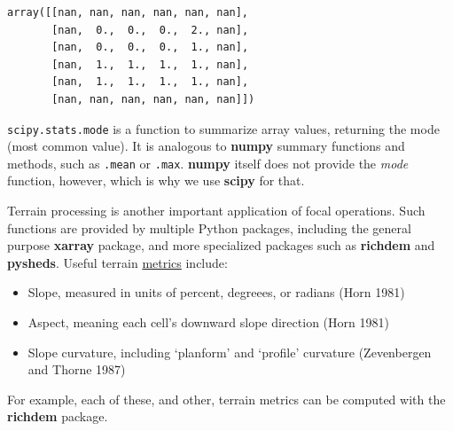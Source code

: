 \documentclass[
  letterpaper,
]{krantz}
\providecommand{\tightlist}{%
  \setlength{\itemsep}{0pt}\setlength{\parskip}{0pt}}\usepackage{longtable,booktabs,array}
\begin{document}
\begin{verbatim}
array([[nan, nan, nan, nan, nan, nan],
       [nan,  0.,  0.,  0.,  2., nan],
       [nan,  0.,  0.,  0.,  1., nan],
       [nan,  1.,  1.,  1.,  1., nan],
       [nan,  1.,  1.,  1.,  1., nan],
       [nan, nan, nan, nan, nan, nan]])
\end{verbatim}

\begin{tcolorbox}[enhanced jigsaw, title=\textcolor{quarto-callout-note-color}{\faInfo}\hspace{0.5em}{Note}, coltitle=black, colbacktitle=quarto-callout-note-color!10!white, breakable, titlerule=0mm, colframe=quarto-callout-note-color-frame, opacitybacktitle=0.6, colback=white, bottomrule=.15mm, left=2mm, leftrule=.75mm, toprule=.15mm, toptitle=1mm, bottomtitle=1mm, arc=.35mm, opacityback=0, rightrule=.15mm]

\texttt{scipy.stats.mode} is a function to summarize array values,
returning the mode (most common value). It is analogous to
\textbf{numpy} summary functions and methods, such as \texttt{.mean} or
\texttt{.max}. \textbf{numpy} itself does not provide the \emph{mode}
function, however, which is why we use \textbf{scipy} for that.

\end{tcolorbox}

Terrain processing is another important application of focal operations.
Such functions are provided by multiple Python packages, including the
general purpose \textbf{xarray} package, and more specialized packages
such as \textbf{richdem} and \textbf{pysheds}. Useful terrain
\href{https://richdem.readthedocs.io/en/latest/python_api.html?highlight=TerrainAttribute\#richdem.TerrainAttribute}{metrics}
include:

\begin{itemize}
\tightlist
\item
  Slope, measured in units of percent, degreees, or radians (Horn 1981)
\item
  Aspect, meaning each cell's downward slope direction (Horn 1981)
\item
  Slope curvature, including `planform' and `profile' curvature
  (Zevenbergen and Thorne 1987)
\end{itemize}

For example, each of these, and other, terrain metrics can be computed
with the \textbf{richdem} package.
\end{document}
